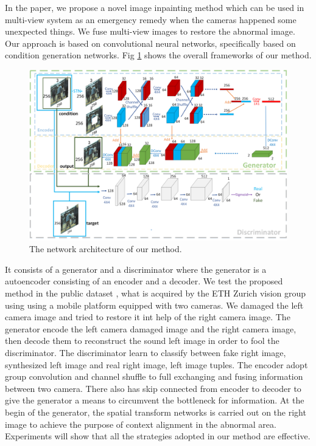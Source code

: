 \documentclass{IEEE_lsens}
\begin{document}
In the paper, we propose a novel image inpainting method which can be used in multi-view system as an emergency remedy when the cameras happened some unexpected things. We fuse multi-view images to restore the abnormal image. Our approach is based on convolutional neural networks, specifically based on condition generation networks. Fig \ref{fig:networkStruct} shows the overall frameworks of our method. 
\begin{figure}[!t]
\centering
\includegraphics[width=6.5in]{networkStruct}
\caption{The network architecture of our method.}
\label{fig:networkStruct}
\end{figure}
It consists of a generator and a discriminator where the generator is a autoencoder consisting of an encoder and a decoder. We test the proposed method in the public dataset \cite{Ess2008::mobile}, what is acquired by the ETH Zurich vision group using using a mobile platform equipped with two cameras. We damaged the left camera image and tried to restore it int help of the right camera image. The generator encode the left camera damaged image and the right camera image, then decode them to reconstruct the sound left image in order to fool the discriminator. The discriminator learn to classify between fake {right image, synthesized left image} and real {right image, left image} tuples. The encoder adopt group convolution and channel shuffle to full exchanging and fusing information between two camera. There also has skip connected from encoder to decoder to give the generator a means to circumvent the bottleneck for information. At the begin of the generator, the spatial transform networks is carried out on the right image to achieve the purpose of context alignment in the abnormal area. Experiments will show that all the strategies adopted in our method are effective.
\end{document}
